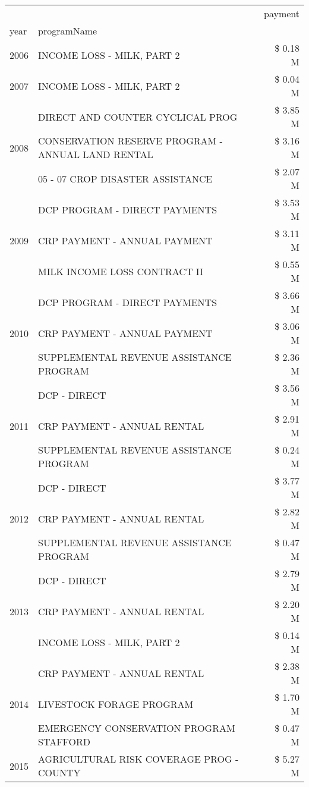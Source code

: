 \begin{tabular}{llr}
\toprule
 &  & payment \\
year & programName &  \\
\midrule
2006 & INCOME LOSS - MILK, PART 2 & \$ 0.18 M \\
\cline{1-3}
2007 & INCOME LOSS - MILK, PART 2 & \$ 0.04 M \\
\cline{1-3}
\multirow[t]{3}{*}{2008} & DIRECT AND COUNTER CYCLICAL PROG & \$ 3.85 M \\
 & CONSERVATION RESERVE PROGRAM - ANNUAL LAND RENTAL & \$ 3.16 M \\
 & 05 - 07 CROP DISASTER ASSISTANCE & \$ 2.07 M \\
\cline{1-3}
\multirow[t]{3}{*}{2009} & DCP PROGRAM - DIRECT PAYMENTS & \$ 3.53 M \\
 & CRP PAYMENT - ANNUAL PAYMENT & \$ 3.11 M \\
 & MILK INCOME LOSS CONTRACT II & \$ 0.55 M \\
\cline{1-3}
\multirow[t]{3}{*}{2010} & DCP PROGRAM - DIRECT PAYMENTS & \$ 3.66 M \\
 & CRP PAYMENT - ANNUAL PAYMENT & \$ 3.06 M \\
 & SUPPLEMENTAL REVENUE ASSISTANCE PROGRAM & \$ 2.36 M \\
\cline{1-3}
\multirow[t]{3}{*}{2011} & DCP - DIRECT & \$ 3.56 M \\
 & CRP PAYMENT - ANNUAL RENTAL & \$ 2.91 M \\
 & SUPPLEMENTAL REVENUE ASSISTANCE PROGRAM & \$ 0.24 M \\
\cline{1-3}
\multirow[t]{3}{*}{2012} & DCP - DIRECT & \$ 3.77 M \\
 & CRP PAYMENT - ANNUAL RENTAL & \$ 2.82 M \\
 & SUPPLEMENTAL REVENUE ASSISTANCE PROGRAM & \$ 0.47 M \\
\cline{1-3}
\multirow[t]{3}{*}{2013} & DCP - DIRECT & \$ 2.79 M \\
 & CRP PAYMENT - ANNUAL RENTAL & \$ 2.20 M \\
 & INCOME LOSS - MILK, PART 2 & \$ 0.14 M \\
\cline{1-3}
\multirow[t]{3}{*}{2014} & CRP PAYMENT - ANNUAL RENTAL & \$ 2.38 M \\
 & LIVESTOCK FORAGE PROGRAM & \$ 1.70 M \\
 & EMERGENCY CONSERVATION PROGRAM STAFFORD & \$ 0.47 M \\
\cline{1-3}
\multirow[t]{3}{*}{2015} & AGRICULTURAL RISK COVERAGE PROG - COUNTY & \$ 5.27 M \\

\end{tabular}
